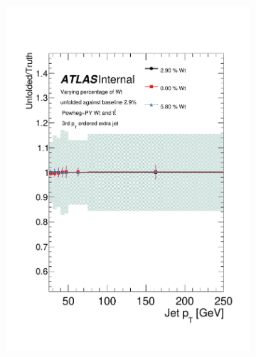 \begin{figure}
\begin{subfigure}[]{0.3\textwidth}
\includegraphics[width=\textwidth]{fig/Wt/TruthRatioJet2.pdf}
\end{subfigure}
~
\begin{subfigure}[]{0.3\textwidth}

\end{subfigure}
\end{figure}
